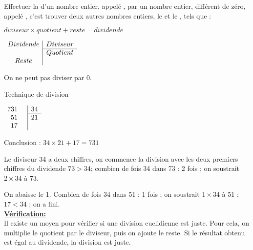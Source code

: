
\begin{mydef}
	Effectuer la  d’un nombre entier, appelé , par un nombre entier, différent de zéro, appelé , c’est trouver deux autres nombres entiers, le  et le , tels que : 
	
	$diviseur \times quotient + reste = dividende$
	
\end{mydef}


\begin{center}
	$\begin{array}{c|c}
		Dividende & Diviseur \\
		\cline{2-2}
				& Quotient \\
		Reste & \\
	\end{array}$
\end{center}

\begin{mywarning}
	On ne peut pas diviser par 0.
\end{mywarning}


\vspace*{-1cm}	

\begin{mymethname}{Technique de division}
\begin{multicols}{2}
	\begin{center}
		$\begin{array}{rc|c}
		731 & & 34 \\
		\cline{3-3}
		51& & 21 \\
		17 & & \\
		\end{array}$
	\end{center}

Conclusion : $34 \times 21 + 17 = 731$
\end{multicols}


Le diviseur 34 a deux chiffres, on commence la division avec les deux premiers chiffres du dividende $73 > 34 $; 
combien de fois 34 dans 73 : 2 fois ; on soustrait $2 \times 34$ à 73.

On abaisse le 1. 
Combien de fois 34 dans 51 : 1 fois ; 
on soustrait $1 \times 34$ à 51 ; $17 < 34$ ; on a fini.\\


\textbf{\underline{Vérification:}}\\
Il existe un moyen pour vérifier si une division euclidienne est juste. 
Pour cela, on multiplie le quotient par le diviseur, puis on ajoute le reste. 
Si le résultat obtenu est égal au dividende, la division est juste.
\end{mymethname}


